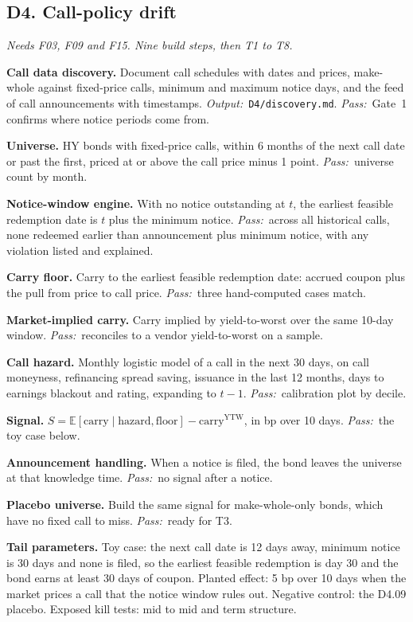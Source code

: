 \documentclass[11pt,letterpaper]{article}
\makeatletter
\newcommand{\code}[1]{\texttt{#1}}
\newcommand{\E}{\mathbb{E}}
\newcommand*{\twodigit}[1]{\expandafter\@twodigit\csname c@#1\endcsname}
\newcommand*{\@twodigit}[1]{\ifnum#1<10 0\fi\number#1}
\newcommand{\stepname}[1]{\textbf{#1.}}
\newcommand{\Out}{\textit{Output:}~}
\newcommand{\Pass}{\textit{Pass:}~}
\makeatother
\begin{document}
\subsection{D4. Call-policy drift}
\emph{Needs F03, F09 and F15. Nine build steps, then T1 to T8.}
\begin{ladder}[label=\textbf{D4.\twodigit*}]
\item \stepname{Call data discovery} Document call schedules with dates and prices, make-whole against fixed-price calls, minimum and maximum notice days, and the feed of call announcements with timestamps. \Out \code{D4/discovery.md}. \Pass Gate~1 confirms where notice periods come from.
\item \stepname{Universe} HY bonds with fixed-price calls, within 6 months of the next call date or past the first, priced at or above the call price minus 1 point. \Pass universe count by month.
\item \stepname{Notice-window engine} With no notice outstanding at $t$, the earliest feasible redemption date is $t$ plus the minimum notice. \Pass across all historical calls, none redeemed earlier than announcement plus minimum notice, with any violation listed and explained.
\item \stepname{Carry floor} Carry to the earliest feasible redemption date: accrued coupon plus the pull from price to call price. \Pass three hand-computed cases match.
\item \stepname{Market-implied carry} Carry implied by yield-to-worst over the same 10-day window. \Pass reconciles to a vendor yield-to-worst on a sample.
\item \stepname{Call hazard} Monthly logistic model of a call in the next 30 days, on call moneyness, refinancing spread saving, issuance in the last 12 months, days to earnings blackout and rating, expanding to $t-1$. \Pass calibration plot by decile.
\item \stepname{Signal} $S=\E[\mathrm{carry}\mid\text{hazard},\text{floor}]-\mathrm{carry}^{\mathrm{YTW}}$, in bp over 10 days. \Pass the toy case below.
\item \stepname{Announcement handling} When a notice is filed, the bond leaves the universe at that knowledge time. \Pass no signal after a notice.
\item \stepname{Placebo universe} Build the same signal for make-whole-only bonds, which have no fixed call to miss. \Pass ready for T3.
\end{ladder}
\textbf{Tail parameters.} Toy case: the next call date is 12 days away, minimum notice is 30 days and none is filed, so the earliest feasible redemption is day 30 and the bond earns at least 30 days of coupon. Planted effect: 5 bp over 10 days when the market prices a call that the notice window rules out. Negative control: the D4.09 placebo. Exposed kill tests: mid to mid and term structure.
\end{document}

